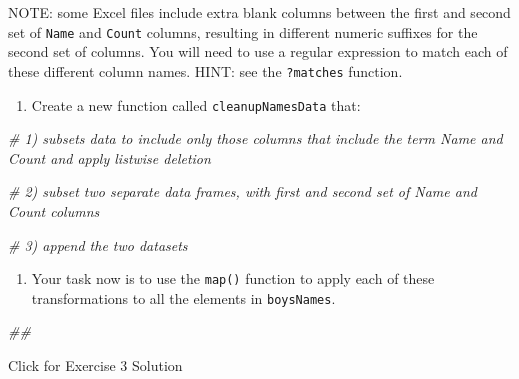\documentclass[
]{book}
\newenvironment{Shaded}{\begin{snugshade}}{\end{snugshade}}
\newcommand{\CommentTok}[1]{\textcolor[rgb]{0.56,0.35,0.01}{\textit{#1}}}
\providecommand{\tightlist}{%
  \setlength{\itemsep}{0pt}\setlength{\parskip}{0pt}}
\begin{document}
NOTE: some Excel files include extra blank columns between the first and second
set of \texttt{Name} and \texttt{Count} columns, resulting in different numeric suffixes
for the second set of columns. You will need to use a regular expression
to match each of these different column names. HINT: see the \texttt{?matches}
function.

\begin{enumerate}
\def\labelenumi{\arabic{enumi}.}
\tightlist
\item
  Create a new function called \texttt{cleanupNamesData} that:
\end{enumerate}

\begin{Shaded}
\begin{Highlighting}[]
\CommentTok{\# 1) subsets data to include only those columns that include the term \textasciigrave{}Name\textasciigrave{} and \textasciigrave{}Count\textasciigrave{} and apply listwise deletion}

\CommentTok{\# 2) subset two separate data frames, with first and second set of \textasciigrave{}Name\textasciigrave{} and \textasciigrave{}Count\textasciigrave{} columns}

\CommentTok{\# 3) append the two datasets}
\end{Highlighting}
\end{Shaded}

\begin{enumerate}
\def\labelenumi{\arabic{enumi}.}
\setcounter{enumi}{1}
\tightlist
\item
  Your task now is to use the \texttt{map()} function to apply each of these
  transformations to all the elements in \texttt{boysNames}.
\end{enumerate}

\begin{Shaded}
\begin{Highlighting}[]
\CommentTok{\#\# }
\end{Highlighting}
\end{Shaded}

{Click for Exercise 3 Solution}
\end{document}
